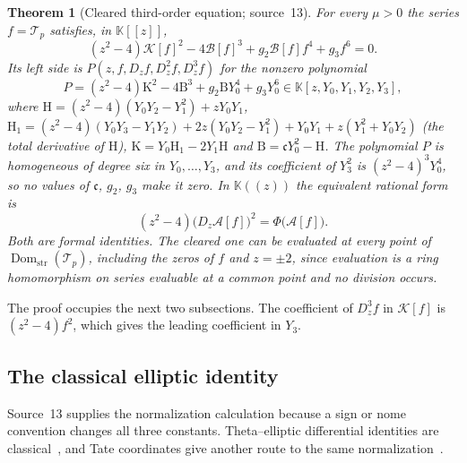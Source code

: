 \documentclass[11pt]{article}
\numberwithin{equation}{section}
\newtheorem{theorem}{Theorem}[section]
\theoremstyle{definition}
\theoremstyle{remark}
\newcommand{\Dom}{\operatorname{Dom}_{\mathrm{str}}}
\newcommand{\KK}{\mathbb K}
\begin{document}
\begin{theorem}[Cleared third-order equation; source~13]\label{hol:td:thm:ode}
For every $\mu>0$ the series $f=\mathcal T_p$ satisfies, in $\KK[[z]]$,
\begin{equation}\label{hol:td:eq:cleared}
 (z^2-4)\mathcal K[f]^2-4\mathcal B[f]^3+g_2\mathcal B[f]f^4+g_3f^6=0 .
\end{equation}
Its left side is $P(z,f,D_zf,D_z^2f,D_z^3f)$ for the nonzero polynomial
\begin{equation}\label{hol:td:eq:jetpoly}
 P=(z^2-4)\mathrm K^2-4\mathrm B^3+g_2\mathrm BY_0^4+g_3Y_0^6\in\KK[z,Y_0,Y_1,Y_2,Y_3],
\end{equation}
where
$\mathrm H=(z^2-4)(Y_0Y_2-Y_1^2)+zY_0Y_1$,
$\mathrm H_1=(z^2-4)(Y_0Y_3-Y_1Y_2)+2z(Y_0Y_2-Y_1^2)+Y_0Y_1+z(Y_1^2+Y_0Y_2)$
(the total derivative of $\mathrm H$),
$\mathrm K=Y_0\mathrm H_1-2Y_1\mathrm H$ and $\mathrm B=\mathfrak cY_0^2-\mathrm
H$. The polynomial $P$ is homogeneous of degree six in $Y_0,\ldots,Y_3$, and
its coefficient of $Y_3^2$ is $(z^2-4)^3Y_0^4$, so no values of $\mathfrak c$,
$g_2$, $g_3$ make it zero. In $\KK((z))$ the equivalent rational form is
\begin{equation}\label{hol:td:eq:rationalODE}
 (z^2-4)\bigl(D_z\mathcal A[f]\bigr)^2=\Phi\bigl(\mathcal A[f]\bigr).
\end{equation}
Both are formal identities. The cleared one can be evaluated at every point of
$\Dom(\mathcal T_p)$, including the zeros of $f$ and $z=\pm2$, since
evaluation is a ring homomorphism on series evaluable at a common point and no
division occurs.
\end{theorem}

The proof occupies the next two subsections. The coefficient of $D_z^3f$ in
$\mathcal K[f]$ is $(z^2-4)f^2$, which gives the leading coefficient in $Y_3$.

\subsection{The classical elliptic identity}\label{hol:td:sub:elliptic}

Source~13 supplies the normalization calculation because a sign or nome
convention changes all three constants. Theta--elliptic differential
identities are classical~\cite{dlmfelliptic,sebbar}, and Tate coordinates give
another route to the same normalization~\cite{woodbury,repotate}.
\end{document}
